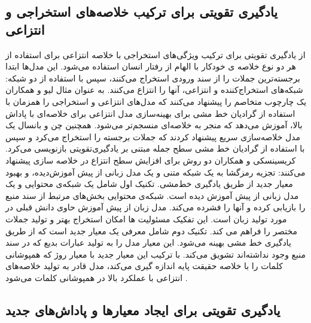 \subsection{یادگیری تقویتی برای ترکیب خلاصه‌های استخراجی و انتزاعی} 
از یادگیری تقویتی برای ترکیب ویژگی‌های استخراجی با خلاصه انتزاعی برای استفاده از هر دو نوع خلاصه ی خودکار با الهام از رفتار انسان استفاده می‌شود. این مدل‌ها ابتدا برجسته‌ترین جملات را از سند ورودی استخراج می‌کنند، سپس با استفاده از دو شبکه: شبکه‌های استخراج‌کننده و انتزاعی، آنها را انتزاع می‌کنند. به عنوان مثال لیو
و همکاران یک چارچوب متخاصم را پیشنهاد می‌کنند که مدل‌های انتزاعی و استخراجی را همزمان با استفاده از گرادیان خط ‌مشی برای بهینه‌سازی مدل انتزاعی برای خلاصه‌ای با پاداش بالا، آموزش می‌دهد که منجر به خلاصه‌ای منسجم‌تر می‌شود\cite{liu2018generative}.
همچنین چن و بانسال
یک مدل خلاصه‌سازی سریع پیشنهاد کردند که جملات برجسته را استخراج می‌کرد و سپس با استفاده از گرادیان خط مشی سطح جمله مبتنی بر یادگیری‌تقویتی بازنویسی می‌کرد\cite{chen2018fast}.
کریسینسکی 
و همکاران  دو روش برای افزایش سطح انتزاع در خلاصه سازی  پیشنهاد می‌کنند: تجزیه رمزگشا به یک شبکه متنی و یک مدل زبانی از پیش آموزش‌دیده، و بهبود معیار جدید از طریق یادگیری خط‌مشی.
تکنیک اول شامل یک شبکه‌ی محتوایی
و یک مدل زبانی از پیش آموزش دیده است. شبکه‌ی محتوایی  بخش‌های مرتبط از سند منبع را بازیابی کرده و آنها را فشرده می‌کند. مدل زبان از پیش آموزش حاوی دانش قبلی در مورد تولید زبان است. این تفکیک مسئولیت ها امکان استخراج بهتر و تولید جملات مختصر را فراهم می کند.
تکنیک دوم شامل معرفی یک معیار جدید است که از طریق یادگیری خط مشی بهینه می‌شود. این معیار مدل را به تولید عبارات بدیع که در سند   منبع وجود نداشته‌اند تشویق می‌کند. با ترکیب این معیار جدید با معیار روژ که همپوشانی کلمات را با خلاصه حقیقت پایه اندازه گیری می‌کند، مدل قادر به تولید خلاصه‌های انتزاعی با عملکرد بالا در همپوشانی کلمات می‌شود \cite{kryscinski-etal-2018-improving}.

\subsection{یادگیری تقویتی  برای ایجاد معیارها و پاداش‌های جدید}

